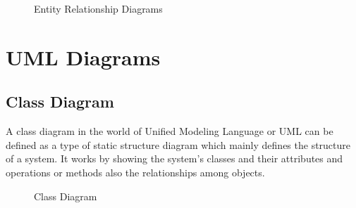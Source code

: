 \documentclass[oneside,a4paper,12pt]{report}
\begin{document}
\begin{center}
	\begin{figure}[!htbp]
		\centering
  	    \caption{Entity Relationship Diagrams}
	    \label{fig:Entity Relationship Diagrams}
	\end{figure}
\end{center} 

\newpage
\section{UML Diagrams}
\subsection{Class Diagram}
\hspace*{0.5cm} A class diagram in the world of Unified Modeling Language or UML can be defined as a type of static structure diagram which mainly defines the structure of a system. It works by showing the system’s classes and their attributes and operations or methods also the relationships among objects.

\begin{center}
	\begin{figure}[!htbp]
		\centering
  	    \caption{Class Diagram}
	    \label{fig:Class Diagram}
	\end{figure}
\end{center}
\end{document}
